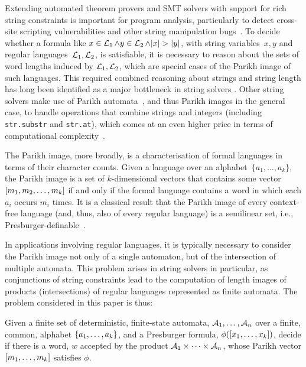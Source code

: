 Extending automated theorem provers and SMT solvers with support for rich string
constraints is important for program analysis, particularly to detect cross-site
scripting vulnerabilities and other string manipulation
bugs~\cite{DBLP:books/sp/BultanYAA17}.
%
To decide whether a formula like $x \in \operatorname{\mathcal{L}}_1 \wedge y \in \operatorname{\mathcal{L}}_2
\wedge |x| > |y|$, with string variables~$x, y$ and regular
languages~$\operatorname{\mathcal{L}}_1, \operatorname{\mathcal{L}}_2$, is satisfiable, it is necessary to reason
about the sets of word lengths induced by $\operatorname{\mathcal{L}}_1, \operatorname{\mathcal{L}}_2$, which are
special cases of the Parikh image of such languages.
This required combined reasoning about
strings and string length has long been identified as a major bottleneck in
string solvers
\cite{DBLP:conf/cav/AbdullaACHRRS15,length-aware-solver,approximate-parikh,DBLP:journals/corr/BerzishZG17}.
Other string solvers make use of Parikh automata~\cite{parikh-automata}, and
thus Parikh images in the general case, to handle operations that combine
strings and integers (including
\verb!str.substr!  and \verb!str.at!), which comes at an even higher price in
terms of computational complexity~\cite{ostrich-plus}.

The Parikh image, more broadly, is a characterisation of formal languages in
terms of their character counts. Given a language over an alphabet~$\{a_1,
\ldots, a_k\}$, the Parikh image is a set of $k$-dimensional vectors that
contains some vector~$\left[{m_1, m_2, \ldots, m_k}\right]$ if and only if the
formal language contains a word in which each $a_i$ occurs $m_i$ times. It is a
classical result that the Parikh image of every context-free language (and,
thus, also of every regular language) is a semilinear set,
i.e., Presburger-definable~\cite{parikh-theorem}.

In applications involving regular languages, it is typically necessary
to consider the Parikh image not only of a single automaton, but of the
intersection of multiple automata. This problem arises in string solvers in
particular, as conjunctions of string constraints lead to the computation of
length images of products (intersections) of regular languages represented as
finite automata. The problem considered in this paper is thus:
{
    \centering
    \begin{tcolorbox}[colback=gray!5!white,colframe=gray!75!black,%
        title=Satisfiability of Parikh images of a product of automata,%
        width=0.8\linewidth]
        Given a finite set of deterministic, finite-state automata, $\mathcal{A}_1, \ldots, \mathcal{A}_n$
        over a finite, common, alphabet $\left\{a_1, \ldots, a_k\right\}$,
        and a Presburger formula, $\phi(\left[{x_1, \ldots, x_k}\right])$, 
        decide if there is a word, $w$ accepted by the 
        product $\mathcal{A}_1 \times \cdots \times \mathcal{A}_n$, whose Parikh vector 
        $\left[{m_1, \ldots, m_k}\right]$ satisfies $\phi$.
    \end{tcolorbox}
  }

